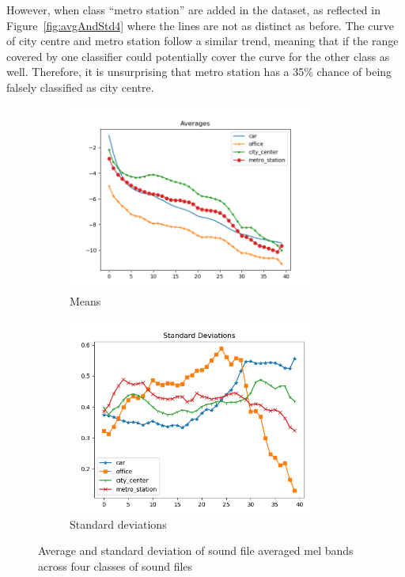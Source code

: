\documentclass[11pt]{article}
\begin{document}
However, when class ``metro station'' are added in the dataset, as reflected in Figure~\ref{fig:avgAndStd4} where the lines are not as distinct as before. The curve of city centre and metro station follow a similar trend, meaning that if the range covered by one classifier could potentially cover the curve for the other class as well. Therefore, it is unsurprising that metro station has a 35\% chance of being falsely classified as city centre.

\begin{figure}[!htbp]
	\centering
	\begin{subfigure}[t]{0.48\textwidth}
		\centering
		\includegraphics[width=0.9\textwidth]{yiyang_figures/avg_4_classes.png}
		\caption{Means}
	\end{subfigure}
	\begin{subfigure}[t]{0.48\textwidth}
		\centering
		\includegraphics[width=0.9\textwidth]{yiyang_figures/std_4_classes.png}
		\caption{Standard deviations}
	\end{subfigure}
	\caption{Average and standard deviation of sound file averaged mel bands across four classes of sound files}
	\label{fig:avgAndStdAll}
\end{figure}
\end{document}
